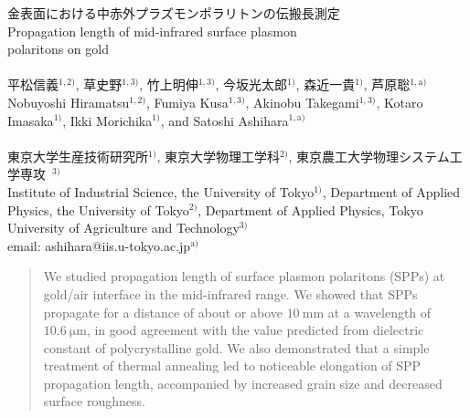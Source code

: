 \documentclass[a4,10truept]{jsarticle}
\begin{document}
\hspace{35truemm} \begin{minipage}{127truemm}
{\fontsize{14truept}{0truept} \selectfont \gt 金表面における中赤外プラズモンポラリトンの伝搬長測定\\ \rm Propagation length of mid-infrared surface plasmon\\ polaritons on gold\\ }\vspace{-0.5em}
{\fontsize{10truept}{0truept} \selectfont \mc \\ 平松信義$\!^{1,2)}$, 草史野$\!^{1,3)}$, 竹上明伸$\!^{1,3)}$, 今坂光太郎$\!^{1)}$, 森近一貴$\!^{1)}$, 芦原聡$\!^{1,\mathrm{a})}$\\ \rm Nobuyoshi Hiramatsu$^{1,2)}$, Fumiya Kusa$^{1,3)}$, Akinobu Takegami$^{1,3)}$, Kotaro Imasaka$^{1)}$, Ikki Morichika$^{1)}$, and Satoshi Ashihara$^{1,\mathrm{a})}$\\}\vspace{-0.7em}
{\fontsize{9.7truept}{0truept} \selectfont \mc \\ 東京大学生産技術研究所$\!^{1)}$, 東京大学物理工学科$\!^{2)}$, 東京農工大学物理システム工学専攻~$\!^{3)}$\\ \rm
Institute of Industrial Science, the University of Tokyo$^{1)}$, Department of Applied Physics, the University of Tokyo$^{2)}$, Department of Applied Physics, Tokyo University of Agriculture and Technology$^{3)}$\\
email: ashihara@iis.u-tokyo.ac.jp$^{\mathrm{a})}$\\
}
\end{minipage}

\begin{abstract}
{\fontsize{10pt}{0pt} \rm We studied propagation length of surface plasmon polaritons (SPPs) at gold/air interface in the mid-infrared range. We showed that SPPs propagate for a distance of about or above $10\:\mathrm{mm}$ at a wavelength of $10.6\:\mathrm{\mu m}$, in good agreement with the value predicted from dielectric constant of polycrystalline gold. We also demonstrated that a simple treatment of thermal annealing led to noticeable elongation of SPP propagation length, accompanied by increased grain size and decreased surface roughness.}
\end{abstract}

\end{document}
